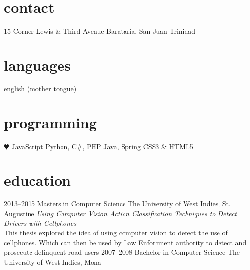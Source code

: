 \documentclass[]{friggeri-cv} %
\begin{document}


\begin{aside} %
\section{contact}
15 Corner Lewis \& Third Avenue
Barataria, San Juan
Trinidad
~
~
\href{mailto:ferronrsmith@gmail.com}{}
\href{http://ferronrsmith.github.io}{}
\href{http://linkedin.com/in/ferronrsmith}{}
\section{languages}
english (mother tongue)
\section{programming}
{\color{red} $\varheartsuit$} JavaScript
Python, C\#, PHP
Java, Spring 
CSS3 \& HTML5
\end{aside}


\section{education}

\begin{entrylist}
\entry
{2013--2015}
{Masters {\normalfont in Computer Science}}
{The University of West Indies, St. Augustine}
{\emph{Using Computer Vision Action Classification Techniques to Detect Drivers with Cellphones} \\ This thesis explored the idea of using computer vision to detect the use of cellphones. Which can then be used by Law Enforcment authority to detect and prosecute delinquent road users }
\entry
{2007--2008}
{Bachelor {\normalfont  in Computer Science}}
{The University of West Indies, Mona}
{}
\end{entrylist}
\end{document}
